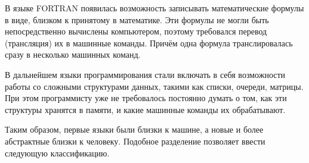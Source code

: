 В языке FORTRAN появилась возможность записывать математические
формулы в виде, близком к принятому в математике. Эти формулы не могли
быть непосредственно вычислены компьютером, поэтому требовался перевод
(трансляция) их в машинные команды. Причём одна формула
транслировалась сразу в несколько машинных команд.

В дальнейшем языки программирования стали включать в себя возможности
работы со сложными структурами данных, такими как списки, очереди,
матрицы. При этом программисту уже не требовалось постоянно думать о
том, как эти структуры хранятся в памяти, и какие машинные команды их
обрабатывают.

Таким образом, первые языки были близки к машине, а новые и более
абстрактные близки к человеку. Подобное разделение позволяет ввести
следующую классификацию.

